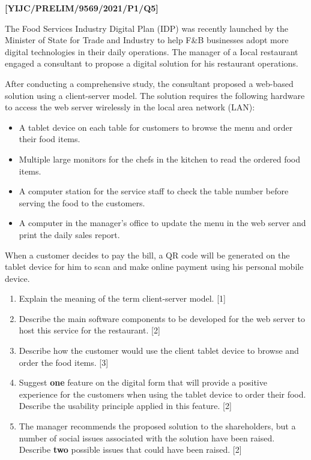 \item \textbf{{[}YIJC/PRELIM/9569/2021/P1/Q5{]} }

The Food Services Industry Digital Plan (IDP) was recently launched
by the Minister of State for Trade and Industry to help F\&B businesses
adopt more digital technologies in their daily operations. The manager
of a Iocal restaurant engaged a consultant to propose a digital solution
for his restaurant operations. 

After conducting a comprehensive study, the consultant proposed a
web-based solution using a client-server model. The solution requires
the following hardware to access the web server wirelessly in the
local area network (LAN): 
\begin{itemize}
\item A tablet device on each table for customers to browse the menu and
order their food items. 
\item Multiple large monitors for the chefs in the kitchen to read the ordered
food items. 
\item A computer station for the service staff to check the table number
before serving the food to the customers. 
\item A computer in the manager\textquoteright s office to update the menu
in the web server and print the daily sales report. 
\end{itemize}
When a customer decides to pay the bill, a QR code will be generated
on the tablet device for him to scan and make online payment using
his personal mobile device.
\begin{enumerate}
\item Explain the meaning of the term client-server model. \hfill{}{[}1{]}
\item Describe the main software components to be developed for the web
server to host this service for the restaurant. \hfill{}{[}2{]}
\item Describe how the customer would use the client tablet device to browse
and order the food items. \hfill{}{[}3{]}
\item Suggest \textbf{one} feature on the digital form that will provide
a positive experience for the customers when using the tablet device
to order their food. Describe the usability principle applied in this
feature. \hfill{}{[}2{]}
\item The manager recommends the proposed solution to the shareholders,
but a number of social issues associated with the solution have been
raised. Describe \textbf{two} possible issues that could have been
raised.\hfill{} {[}2{]}
\end{enumerate}

